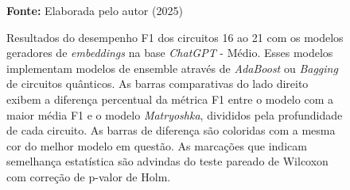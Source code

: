 \begin{figure}
\caption{Resultados do desempenho F1 dos circuitos 16 ao 21 com os modelos geradores de \textit{embeddings} na base \textit{ChatGPT} - Médio. Esses modelos implementam modelos de ensemble através de \textit{AdaBoost} ou \textit{Bagging} de circuitos quânticos. As barras comparativas do lado direito exibem a diferença percentual da métrica F1 entre o modelo com a maior média F1 e o modelo \textit{Matryoshka}, divididos pela profundidade de cada circuito. As barras de diferença são coloridas com a mesma cor do melhor modelo em questão. As marcações que indicam semelhança estatística são advindas do teste pareado de Wilcoxon com correção de p-valor de Holm.}
\label{fig:model_transformer:medium:g6}
     \centering
    \centering

      \par\medskip\ABNTEXfontereduzida\selectfont\textbf{Fonte:} Elaborada pelo autor (2025) \par\medskip
\end{figure}